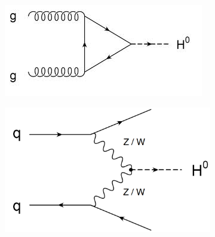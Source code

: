 \begin{figure}[htbp]
   \centering 

    \begin{subfigure}[b]{0.45\textwidth}
        \centering
        \includegraphics[scale=0.6, angle=0]{./figures/gluonfusion}
        \caption{}
        \label{fig:ggf}
    \end{subfigure}
    \quad 
    \begin{subfigure}[b]{0.45\textwidth}
        \centering
        \includegraphics[scale=0.15, angle=0]{./figures/vectorbosonfusion}
        \caption{}
        \label{fig:vbf}
    \end{subfigure}
    

\end{figure}
